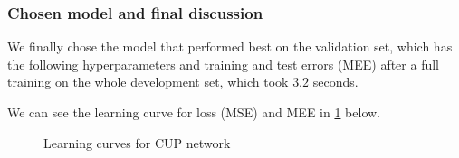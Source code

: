 \subsubsection{Chosen model and final discussion}
We finally chose the model that performed best on the validation set, which has the following hyperparameters and training and test errors (MEE) after a full training on the whole development set, which took $3.2$ seconds.

\begin{table}[htb]
    \centering
    \caption{Hyperparameters and training and test error (MEE) of the chosen model after a full training on the whole development set}
    \label{table:final_train_results}
\end{table}
We can see the learning curve for loss (MSE) and MEE in \cref{fig:cup_plots} below.

\begin{figure}[h]
    \centering
    \caption{Learning curves for CUP network}
    \label{fig:cup_plots}
\end{figure}

